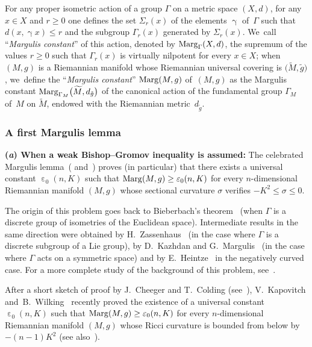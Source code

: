 \documentclass[10pt,a4paper]{amsart}
\numberwithin{equation}{section}
\newcommand{\g}{\operatorname{\gamma}}
\newcommand{\e}{\operatorname{\varepsilon}}
\begin{document}
For any proper isometric action of a group $\Gamma$ on a metric space $(X,d)$, for any $x \in X$ and $r \ge 0$ one defines the set
$\Sigma_r (x)$ of the elements $\g$ of~$\Gamma$ such that $d(x, \g x) \le r$ and the subgroup $\Gamma_r (x)$ generated by $\Sigma_r (x)$. We~call ``\emph{Margulis constant}'' of this action, denoted by ${\rm Marg}_\Gamma (X,d)$, the supremum of the values $r \ge 0$ such that $\Gamma_r (x)$
is virtually nilpotent for every $x \in X$; when $(M,g)$ is a Riemannian manifold whose Riemannian universal covering is $\big(\widetilde M, \tilde g\big)$, we~define the
``\emph{Margulis constant}'' ${\rm Marg}(M,g)$ of~$(M,g)$ as the Margulis constant ${\rm Marg}_{\Gamma_M} \big(\widetilde M, d_{\tilde g}\big)$ of the
canonical action of the fundamental group $\Gamma_M$ of~$M$ on $\widetilde M$, endowed with the Riemannian metric~$d_{\tilde g}$.

\subsubsection{A first Margulis lemma}\label{MargLemme}

{\bf (\emph{a}) When a weak Bishop--Gromov inequality is assumed:}
The celebrated Margulis lemma~(\cite{Mar} and~\cite[Section 37.3]{BZ}) proves (in particular) that there exists a universal constant $\e_0 (n, K)$ such that
${\rm Marg}(M,g) \ge \e_0 (n, K)$ for every $n$-dimensional Riemannian manifold $(M,g)$ whose sectional curvature $\sigma$ verifies $-K^2 \le \sigma \le 0$.


The origin of this problem goes back to Bieberbach's theorem~\cite{Bi} (when $\Gamma$ is a discrete group of isometries of the Euclidean space).
Intermediate results in the same direction were obtained by H.~Zassenhaus~\cite{Zass} (in the case where $\Gamma$ is a discrete subgroup of a Lie group),
 by D.~Kazhdan and G.~Margulis~\cite{KM} (in the case where $\Gamma$ acts on a symmetric space) and by E.~Heintze~\cite{zbMATH01825238} in the
negatively curved case. For a more complete study of the background of this problem, see~\cite{Cou}.

{\sloppy
After a short sketch of proof by J.~Cheeger and T.~Colding (see~\cite{CC96}), V.~Kapovitch and~B.~Wilking~\cite{KW} recently proved the existence of
a universal constant $\e_0 (n, K)$ such that \mbox{${\rm Marg}(M,g) \ge \e_0 (n, K)$} for every $n$-dimensional Riemannian manifold $(M,g)$ whose Ricci curvature
is bounded from below by $-(n-1) K^2$ (see also~\cite{Cou}).

}
\end{document}
